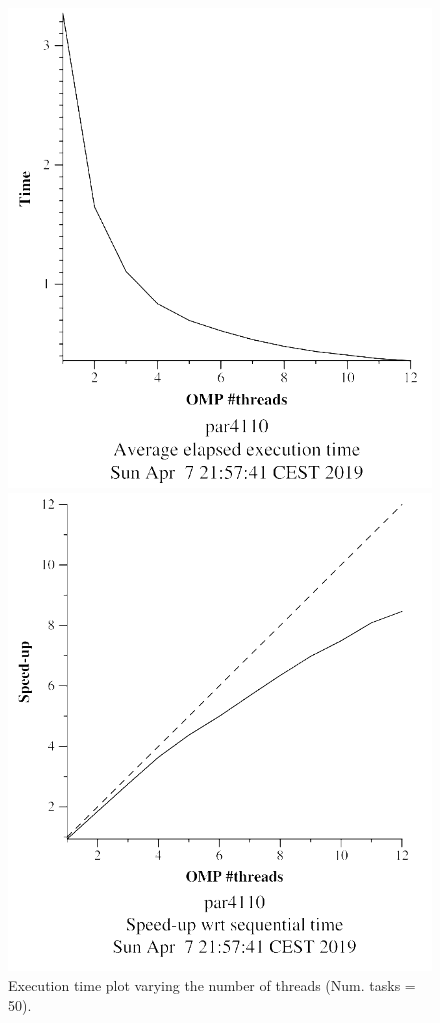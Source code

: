 \documentclass[12pt, a4paper]{article}
\begin{document}
\begin{figure}[H]
\centering
\begin{minipage}[b]{0.4\linewidth}
  \centering
  \includegraphics[scale=0.5]{./mandel-omp-10000-strong-omp-24-50-time}
  \caption{Execution time plot varying the number of threads (Num. tasks = 50).}
  \label{fig:mandel-omp-10000-strong-omp-24-50-time}
\end{minipage}%
\hspace{0.5cm}
\begin{minipage}[b]{0.4\linewidth}
  \centering
  \includegraphics[scale=0.5]{./mandel-omp-10000-strong-omp-24-50-speedup}

\end{minipage}
\end{figure}
\end{document}
